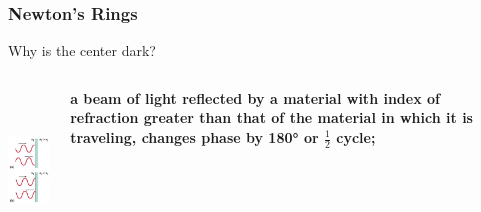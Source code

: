 \documentclass[]{beamer}
\begin{document}


\begin{frame}

\frametitle{Newton's Rings}


 Why is the center dark?
 

   \begin{columns}[c]
   \column{2in}  %
  
\pause

   \begin{center}
  \includegraphics[height=1.7in]{images5/reflexion.jpg}
\end{center}

   \column{2in}


\textbf{a beam of light reflected by a material with index of refraction greater than
that of the material in which it is traveling, changes phase by 180° or $\frac{1}{2}$ cycle;}



   \end{columns}

 



  \end{frame}




\end{document}
